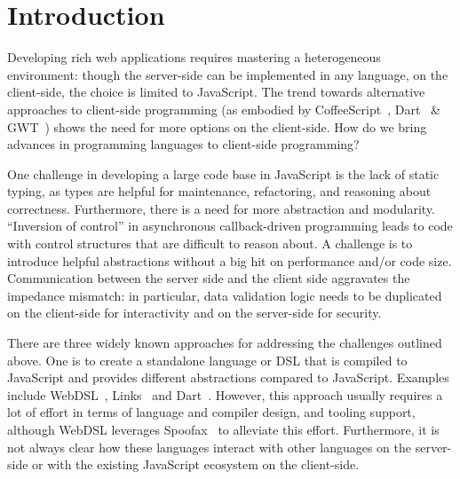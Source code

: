 \documentclass[runningheads,a4paper]{llncs}
\begin{document}
\section{Introduction}

Developing rich web applications requires mastering a heterogeneous environment: though the server-side can be implemented in any language, on the client-side, the choice is limited to JavaScript. The trend towards alternative approaches to client-side programming (as embodied by CoffeeScript~\cite{coffeescript}, Dart~\cite{dart} \& GWT~\cite{gwt}) shows the need for more options on the client-side. How do we bring advances in programming languages to client-side programming?

One challenge in developing a large code base in JavaScript is the lack of static typing, as types are helpful for maintenance, refactoring, and reasoning about correctness. Furthermore, there is a need for more abstraction and modularity. ``Inversion of control'' in asynchronous callback-driven programming leads to code with control structures that are difficult to reason about. A challenge is to introduce helpful abstractions without a big hit on performance and/or code size. Communication between the server side and the client side aggravates the impedance mismatch: in particular, data validation logic needs to be duplicated on the client-side for interactivity and on the server-side for security.


There are three widely known approaches for addressing the challenges outlined above. One is to create a standalone language or DSL that is compiled to JavaScript and provides different abstractions compared to JavaScript. Examples include WebDSL~\cite{webdsl}, Links~\cite{links,links-form} and Dart~\cite{dart}. However, this approach usually requires a lot of effort in terms of language and compiler design, and tooling support, although WebDSL leverages Spoofax~\cite{spoofax} to alleviate this effort. Furthermore, it is not always clear how these languages interact with other languages on the server-side or with the existing JavaScript ecosystem on the client-side.
\end{document}
